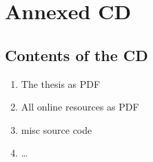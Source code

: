 
\section{Annexed CD}
\label{sec:AnnexedcD}

\subsection{Contents of the CD}
\label{subsec:ContentsCd}

\begin{enumerate}
	\item The thesis as PDF
	\item All online resources as PDF
	\item misc source code
	\item \ldots
\end{enumerate}